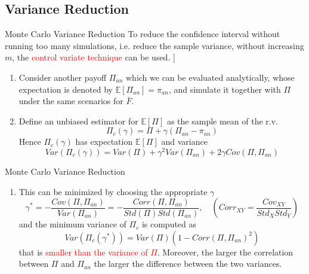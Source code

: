 \documentclass{beamer}
\begin{document}
\subsection{Variance Reduction}
\begin{frame}{Monte Carlo Variance Reduction}
  To reduce the confidence interval without running too many simulations, i.e. reduce the sample variance, without increasing $m$, the \textcolor{red}{control variate technique} can be used.
  \pause]
  \begin{enumerate}
  \item<2-> Consider another payoff $\Pi_{an}$ which we can be evaluated analytically, whose expectation is denoted by $\mathbb{E}[\Pi_{an}] = \pi_{an}$, and simulate it together with $\Pi$ under the same scenarios for $\bar{F}$.
  \item<3-> Define an unbiased estimator for $\mathbb{E}[\Pi]$ as the sample mean of the r.v. 
    \begin{equation*}
      \Pi_c(\gamma) = \Pi + \gamma(\Pi_{an} - \pi_{an})
    \end{equation*}
    Hence $\Pi_c(\gamma)$ has expectation $\mathbb{E}[\Pi]$ and variance
    \begin{equation*}
      Var(\Pi_c(\gamma)) = Var(\Pi) + \gamma^2 Var(\Pi_{an}) + 2\gamma Cov(\Pi, \Pi_{an})
    \end{equation*}
  \end{enumerate}
\end{frame}

\begin{frame}{Monte Carlo Variance Reduction}
	\begin{enumerate}\addtocounter{enumi}{2}
	\item This can be minimized by choosing the appropriate $\gamma$
	\begin{equation*}
	\gamma^* = -\frac{Cov(\Pi, \Pi_{an})}{Var(\Pi_{an})} = -\frac{Corr(\Pi, \Pi_{an})}{Std(\Pi)Std(\Pi_{an})}, \quad (Corr_{XY}=\frac{Cov_{XY}}{Std_X Std_Y})
	\end{equation*}
  	and the minimum variance of $\Pi_c$ is computed as
    \begin{equation*}
     Var(\Pi_c(\gamma^*)) = Var(\Pi)(1 - Corr(\Pi, \Pi_{an})^2)
    \end{equation*}
    that is \textcolor{red}{smaller than the variance of $\Pi$}. Moreover, the larger the correlation between $\Pi$ and $\Pi_{an}$ the larger the difference between the two variances.
  \end{enumerate}
\end{frame}
\end{document}
